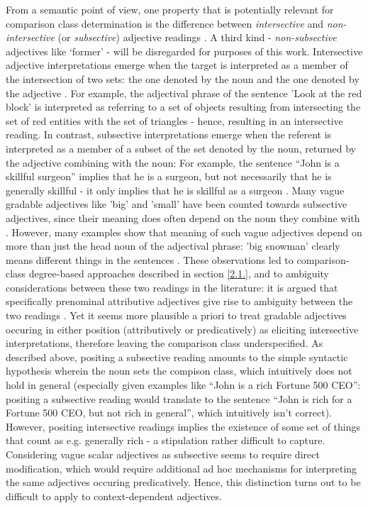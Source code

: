 From a semantic point of view, one property that is potentially relevant for comparison class determination is the difference between \textit{intersective} and \textit{non-intersective} (or \textit{subsective}) adjective readings \parencite{sedivy1999, kennedy2012, hofherr2010adjectives}. A third kind - \textit{non-subsective} adjectives like ‘former’ - will be disregarded for purposes of this work. 
Intersective adjective interpretations emerge when the target is interpreted as a member of the intersection of two sets: the one denoted by the noun and the one denoted by the adjective \parencite{kennedy2012}. For example, the adjectival phrase of the sentence 'Look at the red block' is interpreted as referring to a set of objects resulting from intersecting the set of red entities with the set of triangles - hence, resulting in an intersective reading.
In contrast, subsective interpretations emerge when the referent is interpreted as a member of a subset of the set denoted by the noun, returned by the adjective combining with the noun: For example, the sentence “John is a skillful surgeon” implies that he is a surgeon, but not necessarily that he is generally skillful - it only implies that he is skillful as a surgeon \parencite{kennedy2012}. Many vague gradable adjectives like 'big' and 'small' have been counted towards subsective adjectives, since their meaning does often depend on the noun they combine with \parencite{sedivy1999}. However, many examples show that meaning of such vague adjectives depend on more than just the head noun of the adjectival phrase: 'big snowman' clearly means different things in the sentences \parencite['My 2-year-old son built a really tall snowman yesterday' and 'The D.U. fraternity brothers built a really tall snowman last weekend',][p.115]{sedivy1999}. These observations led to comparison-class degree-based approaches described in section \ref{2.1.}, and to ambiguity considerations between these two readings in the literature: it is argued that specifically prenominal attributive adjectives give rise to ambiguity between the two readings \parencite[cf. ‘Olga is a beautiful dancer’][]{hofherr2010adjectives}. Yet it seems more plausible a priori to treat gradable adjectives occuring in either position (attributively or predicatively) as eliciting intersective interpretations, therefore leaving the comparison class underspecified. As described above, positing a subsective reading amounts to the simple syntactic hypothesis wherein the noun sets the compison class, which intuitively does not hold in general (especially given examples like “John is a rich Fortune 500 CEO”: positing a subsective reading would translate to the sentence “John is rich for a Fortune 500 CEO, but not rich in general”, which intuitively isn’t correct). However, positing intersective readings implies the existence of some set of things that count as e.g. generally rich - a stipulation rather difficult to capture. Considering vague scalar adjectives as subsective seems to require direct modification, which would require additional ad hoc mechanisms for interpreting the same adjectives occuring predicatively. Hence, this distinction turns out to be difficult to apply to context-dependent adjectives. 

